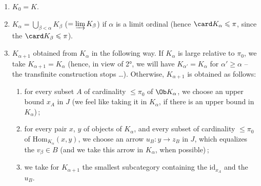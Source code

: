 \begin{enumerate}
\item[1°)] $K_0 = K$.
\item[2°)] $K_{\alpha} = \bigcup_{\beta < \alpha} K_{\beta}$ ($= \varinjlim K_{\beta}$) if $\alpha$ is a limit ordinal (hence $\card K_{\alpha} \leqslant \pi$, since the $\card K_{\beta} \leqslant \pi$).
\item[3°)] $K_{\alpha+1}$ obtained from $K_{\alpha}$ in the following way. If $K_{\alpha}$ is large relative to $\pi_0$, we take $K_{\alpha+1} = K_{\alpha}$ (hence, in view of 2°, we will have $K_{\alpha'} = K_{\alpha}$ for $\alpha' \geqslant \alpha$ -- the transfinite construction stops \ldots). Otherwise, $K_{\alpha+1}$ is obtained as follows:
\begin{enumerate}
\item[a)] for every subset $A$ of cardinality $\leqslant \pi_0$ of $\Ob K_{\alpha}$, we choose an upper bound $x_A$ in $J$ (we feel like taking it in $K_{\alpha}$, if there is an upper bound in $K_{\alpha}$)\,;
\item[b)] for every pair $x$, $y$ of objects of $K_{\alpha}$, and every subset of cardinality $\leqslant \pi_0$ of $\mathrm{Hom}_{K_{\alpha}}(x,y)$, we choose an arrow $u_B : y \longrightarrow z_B$ in $J$, which equalizes the $v_{\beta} \in B$ (and we take this arrow in $K_{\alpha}$, when possible)\,;
\item[c)] we take for $K_{\alpha+1}$ the smallest subcategory containing the $\mathrm{id}_{x_A}$ and the $u_B$.
\end{enumerate}
\end{enumerate}

